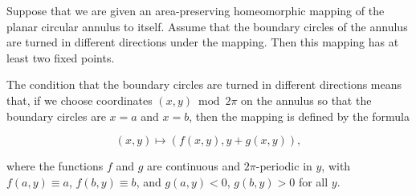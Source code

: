 Suppose that we are given an area-preserving homeomorphic mapping of the planar circular annulus to itself. Assume that the boundary circles of the annulus are turned in different directions under the mapping. Then this mapping has at least two fixed points.

The condition that the boundary circles are turned in different directions means that, if we choose coordinates $(x, y) \bmod 2\pi$ on the annulus so that the boundary circles are $x = a$ and $x = b$, then the mapping is defined by the formula

$$(x, y) \mapsto (f(x, y), y + g(x, y)),$$

where the functions $f$ and $g$ are continuous and $2\pi$-periodic in $y$, with $f(a, y) \equiv a$, $f(b, y) \equiv b$, and $g(a, y) < 0$, $g(b, y) > 0$ for all $y$.
